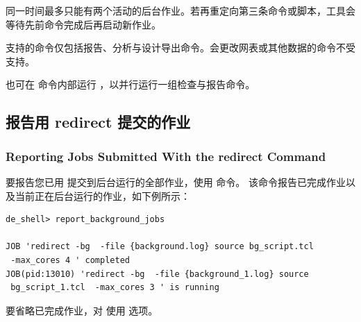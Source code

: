 同一时间最多只能有两个活动的后台作业。若再重定向第三条命令或脚本，工具会等待先前命令完成后再启动新作业。

支持的命令仅包括报告、分析与设计导出命令。会更改网表或其他数据的命令不受支持。

也可在  命令内部运行 ，以并行运行一组检查与报告命令。

\subsection{报告用 redirect 提交的作业}
\subsubsection*{Reporting Jobs Submitted With the redirect Command}

要报告您已用  提交到后台运行的全部作业，使用  命令。
该命令报告已完成作业以及当前正在后台运行的作业，如下例所示：
\begin{lstlisting}
de_shell> report_background_jobs

JOB 'redirect -bg  -file {background.log} source bg_script.tcl
 -max_cores 4 ' completed
JOB(pid:13010) 'redirect -bg  -file {background_1.log} source
 bg_script_1.tcl  -max_cores 3 ' is running
\end{lstlisting}

要省略已完成作业，对  使用  选项。

